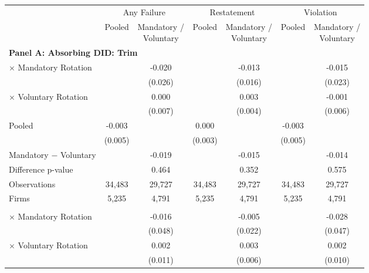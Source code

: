 \documentclass[10pt]{article}
\newcommand{\sym}[1]{\textsuperscript{#1}}
\begin{document}
\begin{minipage}{19cm}\fontsize{10}{12}\selectfont\setlength{\tabcolsep}{4pt}\renewcommand{\arraystretch}{1.12}


\def\sym#1{\ifmmode^{#1}\else\(^{#1}\)\fi}
\centering
{}
\label{tab:absorbing-transition-school-985-or-211-downgrade-no-auditfirm-fe}
\begin{threeparttable}

\begin{tabular}{l cc cc cc}
\toprule
 & \multicolumn{2}{c}{Any Failure} & \multicolumn{2}{c}{Restatement} & \multicolumn{2}{c}{Violation} \\
\cmidrule(lr){2-3}\cmidrule(lr){4-5}\cmidrule(lr){6-7}
 & Pooled & \shortstack{Mandatory /\\Voluntary} & Pooled & \shortstack{Mandatory /\\Voluntary} & Pooled & \shortstack{Mandatory /\\Voluntary} \\
\midrule
\multicolumn{7}{l}{\textbf{Panel A: Absorbing DID: Trim}} \\
$\times$ Mandatory Rotation &  & -0.020 &  & -0.013 &  & -0.015 \\
 &  & (0.026) &  & (0.016) &  & (0.023) \\
$\times$ Voluntary Rotation &  & 0.000 &  & 0.003 &  & -0.001 \\
 &  & (0.007) &  & (0.004) &  & (0.006) \\
Pooled & -0.003 &  & 0.000 &  & -0.003 &  \\
 & (0.005) &  & (0.003) &  & (0.005) &  \\
Mandatory $-$ Voluntary &  & -0.019 &  & -0.015 &  & -0.014 \\
Difference p-value &  & 0.464 &  & 0.352 &  & 0.575 \\
Observations & 34,483 & 29,727 & 34,483 & 29,727 & 34,483 & 29,727 \\
Firms & 5,235 & 4,791 & 5,235 & 4,791 & 5,235 & 4,791 \\
\addlinespace
\multicolumn{7}{l}{\textbf{Panel B: Absorbing DID: Strict}} \\
$\times$ Mandatory Rotation &  & -0.016 &  & -0.005 &  & -0.028 \\
 &  & (0.048) &  & (0.022) &  & (0.047) \\
$\times$ Voluntary Rotation &  & 0.002 &  & 0.003 &  & 0.002 \\
 &  & (0.011) &  & (0.006) &  & (0.010) \\

\end{tabular}
\end{threeparttable}
\end{minipage}
\end{document}
